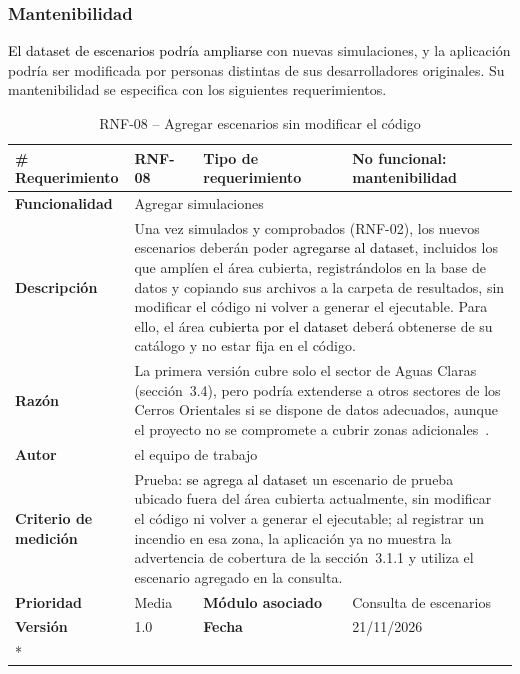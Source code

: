 \subsubsection{Mantenibilidad}
\textcolor{black}{El dataset de escenarios podría ampliarse} con nuevas simulaciones, y la aplicación podría ser modificada por personas distintas de sus desarrolladores originales. Su mantenibilidad se especifica con los siguientes requerimientos.

\begin{longtable}{|p{\rqA}|p{\rqB}|p{\rqC}|p{\rqD}|}
  \caption{RNF-08 -- Agregar escenarios sin modificar el código}\label{tab:rnf-08}\tabularnewline
  \hline
  \textbf{\# Requerimiento} & RNF-08 & \raggedright\textbf{Tipo de requerimiento} & No funcional: mantenibilidad\tabularnewline\hline
  \raggedright\textbf{Funcionalidad} & \multicolumn{3}{p{\rqBCD}|}{Agregar simulaciones}\tabularnewline\hline
  \endfirsthead
  \textbf{Descripción} & \multicolumn{3}{p{\rqBCD}|}{Una vez simulados y comprobados (RNF-02), los nuevos escenarios deberán poder \textcolor{black}{agregarse al dataset}, incluidos los que amplíen el área cubierta, registrándolos en la base de datos y copiando sus archivos a la carpeta de resultados, sin modificar el código ni volver a generar el ejecutable. Para ello, el área \textcolor{black}{cubierta por el dataset} deberá obtenerse de su catálogo y no estar fija en el código.}\tabularnewline\hline
  \textbf{Razón} & \multicolumn{3}{p{\rqBCD}|}{La primera versión cubre solo el sector de Aguas Claras (sección~3.4), pero podría extenderse a otros sectores de los Cerros Orientales si se dispone de datos adecuados, aunque el proyecto no se compromete a cubrir zonas adicionales~\cite{vfp2026}.}\tabularnewline\hline
  \textbf{Autor} & \multicolumn{3}{p{\rqBCD}|}{el equipo de trabajo}\tabularnewline\hline
  \raggedright\textbf{Criterio de medición} & \multicolumn{3}{p{\rqBCD}|}{Prueba: \textcolor{black}{se agrega al dataset} un escenario de prueba ubicado fuera del área cubierta actualmente, sin modificar el código ni volver a generar el ejecutable; al registrar un incendio en esa zona, la aplicación ya no muestra la advertencia de cobertura de la sección~3.1.1 y utiliza el escenario agregado en la consulta.}\tabularnewline\hline
  \textbf{Prioridad} & Media & \raggedright\textbf{Módulo asociado} & Consulta de escenarios\tabularnewline\hline
  \textbf{Versión} & 1.0 & \textbf{Fecha} & 21/11/2026\tabularnewline*\cline{1-4}
\end{longtable}

